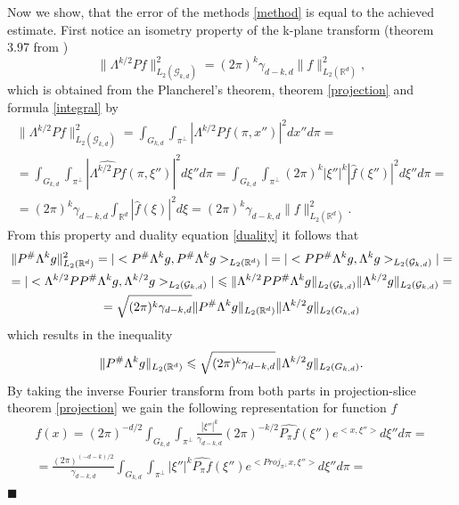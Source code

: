 \documentclass[12pt]{iopart}
\newenvironment{proof}
{\par\noindent{\bf Proof}}
{\hfill$\scriptstyle\blacksquare$}
\begin{document}
\begin{proof}
Now we show, that the error of the methods \eqref{method} is equal to the achieved estimate. First notice an isometry property of the k-plane transform (theorem 3.97 from \cite{MA})
    $$\|\Lambda^{k/2}Pf\|^2_{L_2(\mathcal G_{k,d})}=(2\pi)^k\gamma_{d-k,d}\|f\|^2_{L_2(\mathbb R^d)},$$
which is obtained from the Plancherel's theorem, theorem \ref{projection} and formula \eqref{integral} by    
	\begin{multline*}
	\|\Lambda^{k/2}Pf\|^2_{L_2(\mathcal G_{k,d})}=\int_{G_{k,d}}\int_{\pi^\perp}\left|\Lambda^{k/2}Pf(\pi,x'')\right|^2dx''d\pi=\\
	=\int_{G_{k,d}}\int_{\pi^\perp}\left|\widehat{\Lambda^{k/2}Pf}(\pi,\xi'')\right|^2d\xi''d\pi=\int_{G_{k,d}}\int_{\pi^\perp}(2\pi)^k|\xi''|^k\left|\widehat{f}(\xi'')\right|^2d\xi''d\pi=\\
	=(2\pi)^k\gamma_{d-k,d}\int_{\mathbb R^d}\left|\widehat{f}(\xi)\right|^2d\xi =(2\pi)^k\gamma_{d-k,d}\|f\|^2_{L_2(\mathbb R^d)}.
	\end{multline*}
From this property and duality equation \eqref{duality} it follows that
	    \begin{multline*}
		\|P^\#\Lambda^kg\|_{L_2(\mathbb R^d)}^2=|<P^\#\Lambda^kg,P^\#\Lambda^kg>_{L_2(\mathbb R^d)}|=|<PP^\#\Lambda^kg,\Lambda^kg>_{L_2(\mathcal G_{k,d})}|=\\
		=|<\Lambda^{k/2}PP^\#\Lambda^kg,\Lambda^{k/2}g>_{L_2(\mathcal G_{k,d})}|\leqslant\|\Lambda^{k/2}PP^\#\Lambda^kg\|_{L_2(\mathcal G_{k,d})}\|\Lambda^{k/2}g\|_{L_2(\mathcal G_{k,d})}=\\
		=\sqrt{(2\pi)^k\gamma_{d-k,d}}\|P^\#\Lambda^kg\|_{L_2(\mathbb R^d)}\|\Lambda^{k/2}g\|_{L_2(\mathbb \mathcal G_{k,d})}
		\end{multline*}
which results in the inequality
    \begin{equation}
    \label{ineq}
    \|P^\#\Lambda^kg\|_{L_2(\mathbb R^d)}\leqslant\sqrt{(2\pi)^k\gamma_{d-k,d}}\|\Lambda^{k/2}g\|_{L_2(\mathbb \mathcal G_{k,d})}.
    \end{equation}
By taking the inverse Fourier transform from both parts in projection-slice theorem \ref{projection} we gain the following representation for function $f$
    \begin{multline*}
    f(x) = (2\pi)^{-d/2}\int_{G_{k,d}}\int_{\pi^\perp}\frac{|\xi''|^k}{\gamma_{d-k,d}}(2\pi)^{-k/2}\widehat{P_\pi f}(\xi'')e^{<x,\xi''>}d\xi''d\pi = \\
    = \frac{(2\pi)^{(-d-k)/2}}{\gamma_{d-k,d}}\int_{G_{k,d}}\int_{\pi^\perp}|\xi''|^k\widehat{P_\pi f}(\xi'')e^{<Proj_{\pi^\perp}x,\xi''>}d\xi''d\pi = \\

\end{multline*}
\end{proof}
\end{document}
